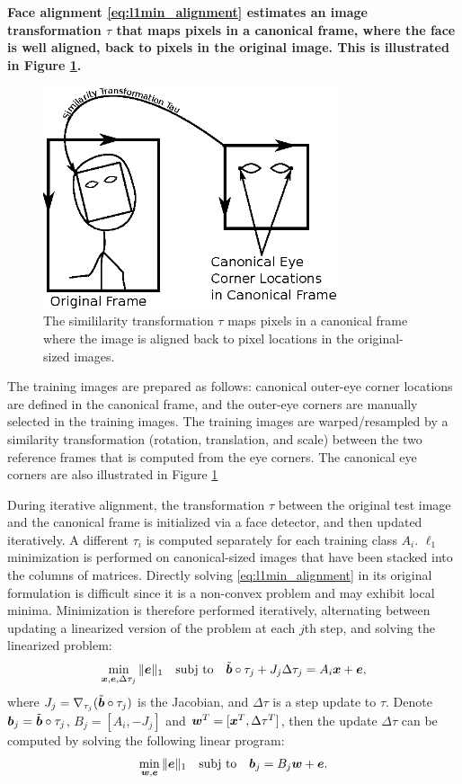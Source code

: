\documentclass[preprint]{sigplanconf}
\begin{document}
{\bf
Face alignment \eqref{eq:l1min_alignment} estimates an image transformation
$\tau$ that maps pixels in a canonical frame, where the face is well aligned,
back to pixels in the original image.  
This is illustrated in Figure \ref{fig:transformation}.
\begin{figure}
\centering
\includegraphics[width=3.4in]{figures/transformation}
\caption{The simililarity transformation $\tau$ maps pixels in a canonical frame
where the image is aligned back to pixel locations in the original-sized images.}
\label{fig:transformation}
\end{figure}
The training images are prepared as
follows: canonical outer-eye corner locations are defined in the canonical
frame, and the outer-eye corners are manually selected in the training images.
The training images are warped/resampled by a similarity transformation
(rotation, translation, and scale) between the two reference frames that is
computed from the eye corners.
The canonical eye corners are also illustrated in Figure \ref{fig:transformation}

During iterative alignment, the transformation $\tau$ between the original test
image and the canonical frame is initialized via a face detector, and then updated
iteratively.  A different $\tau_i$ is computed separately for each training class $A_i$.  
$\ell_1$ minimization is performed on canonical-sized images that
have been stacked into the columns of matrices.  
Directly solving \eqref{eq:l1min_alignment} in its original formulation is difficult since 
it is a non-convex problem and may exhibit local minima.
Minimization is therefore performed iteratively, alternating between updating
a linearized version of the problem at each $j$th step, and solving the linearized problem:
\begin{equation}
\min_{{\boldsymbol{x}}, {\boldsymbol{e}}, \Delta \tau_j}\|{\boldsymbol{e}}\|_1\quad \textup{subj to}\quad \tilde{{\boldsymbol{b}}}\circ\tau_j +  J_j\Delta \tau_j = A_i{\boldsymbol{x}} + {\boldsymbol{e}},
\end{equation}
where $J_j = \nabla_{\tau_j}(\tilde{{\boldsymbol{b}}}\circ\tau_j)$ is the Jacobian, and
$\Delta \tau$ is a step update to $\tau$. Denote ${\boldsymbol{b}}_j =
\tilde{{\boldsymbol{b}}}\circ\tau_j$, $B_j = [A_i, -J_j]$ and ${\boldsymbol{w}}^T = [{\boldsymbol{x}}^T, \Delta
\tau^T]$, then the update $\Delta \tau$ can be computed by solving the
following linear program:
\begin{equation}
\min_{{\boldsymbol{w}}, {\boldsymbol{e}}}\|{\boldsymbol{e}}\|_1\quad \textup{subj to}\quad {\boldsymbol{b}}_j = B_j{\boldsymbol{w}} + {\boldsymbol{e}}.
\label{eq:alignment-linearization}
\end{equation}
}
\end{document}

